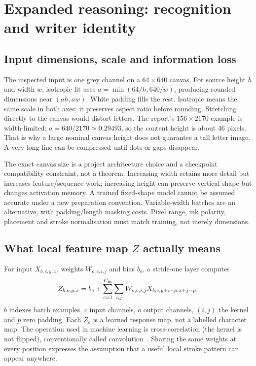 \section{Expanded reasoning: recognition and writer identity}
\label{sec:expand-recognise}
\subsection{Input dimensions, scale and information loss}
The inspected input is one grey channel on a $64\times640$ canvas.
For source height $h$ and width $w$, isotropic fit uses
$a=\min(64/h,640/w)$, producing rounded dimensions near $(ah,aw)$.
White padding fills the rest. Isotropic means the same scale in both axes;
it preserves aspect ratio before rounding. Stretching directly to the canvas
would distort letters. The report's $156\times2170$ example is width-limited:
$a=640/2170\simeq0.29493$, so the content height is about 46 pixels.
That is why a large nominal canvas height does not guarantee a tall letter
image. A very long line can be compressed until dots or gaps disappear.

The exact canvas size is a project architecture choice and a checkpoint
compatibility constraint, not a theorem. Increasing width retains more detail
but increases feature/sequence work; increasing height can preserve vertical
shape but changes activation memory. A trained fixed-shape model cannot be
assumed accurate under a new preparation convention. Variable-width batches
are an alternative, with padding/length masking costs. Pixel range, ink polarity,
placement and stroke normalisation must match training, not merely dimensions.

\subsection{What local feature map $Z$ actually means}
For input $X_{b,c,y,x}$, weights $W_{o,c,i,j}$ and bias $b_o$, a stride-one
layer computes
\[
Z_{b,o,y,x}=b_o+\sum_{c=1}^{C_{\rm in}}\sum_{i,j}
 W_{o,c,i,j}X_{b,c,y+i-p,x+j-p}.
\]
$b$ indexes batch examples, $c$ input channels, $o$ output channels,
$(i,j)$ the kernel and $p$ zero padding. Each $Z_o$ is a learned response
map, not a labelled character map. The operation used in machine learning
is cross-correlation (the kernel is not flipped), conventionally called
convolution~\cite{torchconv}. Sharing the same weights at every position
expresses the assumption that a useful local stroke pattern can appear anywhere.

